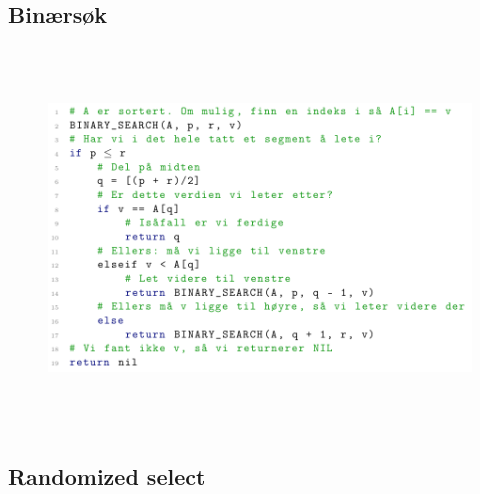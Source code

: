 \documentclass[12pt]{report}
\begin{document}




\newpage
\par

\subsection*{Binærsøk}



\begin{figure}[H]
	\begin{Center}
		\includegraphics[width=6.26in,height=3.97in]{./media/image177.png}
	\end{Center}
\end{figure}



\par

\subsection*{Randomized select}


\end{document}
